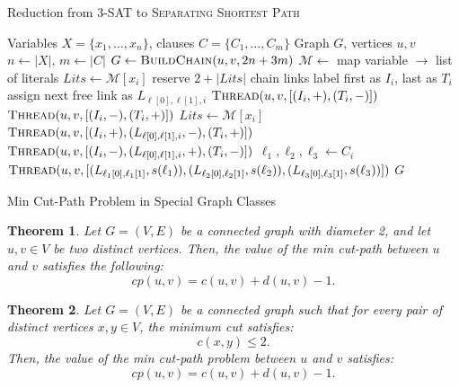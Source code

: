 \documentclass [xcolor=svgnames, t] {beamer}
\newtheorem{thm}{Theorem}[section]
\begin{document}
\begin{frame}{Reduction from \textsc{3-SAT} to \textsc{Separating Shortest Path}}
\vspace{-1.8em}
\begin{algorithm}[H]
\tiny
\caption{Reduction from \textsc{3-SAT} to \textsc{Separating Shortest Path}}
\label{alg:reduction}
\begin{algorithmic}[1]
\Require Variables $X=\{x_1,\dots,x_n\}$, clauses $C=\{C_1,\dots,C_m\}$
\Ensure Graph $G$, vertices $u,v$
\State $n \gets |X|$, $m \gets |C|$
\State $G \gets \textsc{BuildChain}(u,v,2n+3m)$
\State $\mathcal{M} \gets$ map variable $\to$ list of literals
    \State $Lits \gets \mathcal{M}[x_i]$
    \State reserve $2+|Lits|$ chain links
    \State label first as $I_i$, last as $T_i$
        \State assign next free link as $L_{\ell[0],\ell[1],i}$
    \EndFor
\EndFor
{}
    \State $\textsc{Thread}(u,v,[(I_i,+),(T_i,-)])$
    \State $\textsc{Thread}(u,v,[(I_i,-),(T_i,+)])$
    \State $Lits \gets \mathcal{M}[x_i]$
        \State $\textsc{Thread}(u,v,[(I_i,+),(L_{\ell[0],\ell[1],i},-),(T_i,+)])$
        \State $\textsc{Thread}(u,v,[(I_i,-),(L_{\ell[0],\ell[1],i},+),(T_i,-)])$
    \EndFor
\EndFor
{}
    \State $\ell_1,\ell_2,\ell_3 \gets C_i$
    \State $\textsc{Thread}(u,v,[(L_{\ell_1[0],\ell_1[1]},s(\ell_1)),(L_{\ell_2[0],\ell_2[1]},s(\ell_2)),(L_{\ell_3[0],\ell_3[1]},s(\ell_3))])$
\EndFor
\State \Return $G$
\end{algorithmic}
\end{algorithm}
\end{frame}

\begin{frame}{Min Cut-Path Problem in Special Graph Classes}
\begin{thm}
Let \(G = (V, E)\) be a connected graph with diameter 2, and let \(u, v \in V\) be two distinct vertices. Then, the value of the min cut-path between \(u\) and \(v\) satisfies the following:
\[
cp(u, v) = c(u, v) + d(u, v) - 1.
\]
\end{thm}

\begin{thm}
\label{thm:min_cut_path_max_2}
Let \(G = (V, E)\) be a connected graph such that for every pair of distinct vertices \(x, y \in V\), the minimum cut satisfies:  
\[
c(x, y) \leq 2.
\]  
Then, the value of the min cut-path problem between \(u\) and \(v\) satisfies:
\[
cp(u, v) = c(u, v) + d(u, v) - 1.
\]
\end{thm}

\end{frame}
\end{document}
